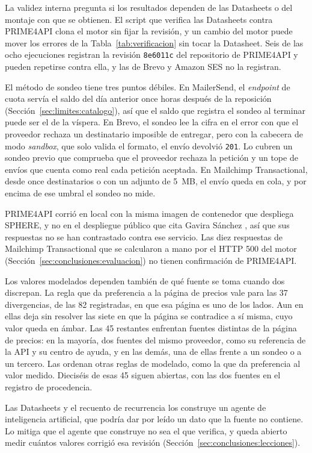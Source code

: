 La validez interna pregunta si los resultados dependen de las Datasheets o del montaje con que se obtienen.
El script que verifica las Datasheets contra PRIME4API clona el motor sin fijar la revisión, y un cambio del motor puede mover los errores de la Tabla~\ref{tab:verificacion} sin tocar la Datasheet.
Seis de las ocho ejecuciones registran la revisión \texttt{8e6011c} del repositorio de PRIME4API y pueden repetirse contra ella, y las de Brevo y Amazon SES no la registran.

El método de sondeo tiene tres puntos débiles.
En MailerSend, el \textit{endpoint} de cuota servía el saldo del día anterior once horas después de la reposición (Sección~\ref{sec:limites:catalogo}), así que el saldo que registra el sondeo al terminar puede ser el de la víspera.
En Brevo, el sondeo lee la cifra en el error con que el proveedor rechaza un destinatario imposible de entregar, pero con la cabecera de modo \textit{sandbox}, que solo valida el formato, el envío devolvió \texttt{201}.
Lo cubren un sondeo previo que comprueba que el proveedor rechaza la petición y un tope de envíos que cuenta como real cada petición aceptada.
En Mailchimp Transactional, desde once destinatarios o con un adjunto de 5~MB, el envío queda en cola, y por encima de ese umbral el sondeo no mide.

PRIME4API corrió en local con la misma imagen de contenedor que despliega SPHERE, y no en el despliegue público que cita Gavira Sánchez \citep{gavira2026tfm}, así que sus respuestas no se han contrastado contra ese servicio.
Las diez respuestas de Mailchimp Transactional que se calcularon a mano por el HTTP 500 del motor (Sección~\ref{sec:conclusiones:evaluacion}) no tienen confirmación de PRIME4API.

Los valores modelados dependen también de qué fuente se toma cuando dos discrepan.
La regla que da preferencia a la página de precios vale para las 37 divergencias, de las 82 registradas, en que esa página es uno de los lados.
Aun en ellas deja sin resolver las siete en que la página se contradice a sí misma, cuyo valor queda en ámbar.
Las 45 restantes enfrentan fuentes distintas de la página de precios: en la mayoría, dos fuentes del mismo proveedor, como su referencia de la API y su centro de ayuda, y en las demás, una de ellas frente a un sondeo o a un tercero.
Las ordenan otras reglas de modelado, como la que da preferencia al valor medido.
Dieciséis de esas 45 siguen abiertas, con las dos fuentes en el registro de procedencia.

Las Datasheets y el recuento de recurrencia los construye un agente de inteligencia artificial, que podría dar por leído un dato que la fuente no contiene.
Lo mitiga que el agente que construye no sea el que verifica, y queda abierto medir cuántos valores corrigió esa revisión (Sección~\ref{sec:conclusiones:lecciones}).

